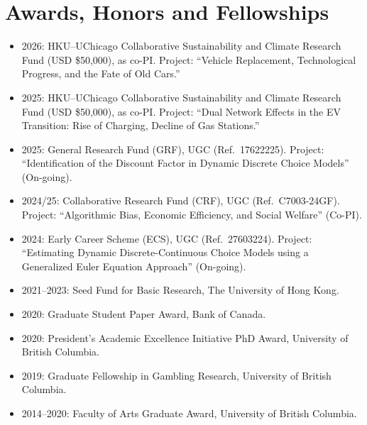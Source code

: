 \documentclass[11pt]{article}
\begin{document}
\section*{Awards, Honors and Fellowships}
\begin{itemize}[leftmargin=*,itemsep=0pt,parsep=0pt,topsep=1pt]
  \item \textcolor{muted}{2026:} HKU--UChicago Collaborative Sustainability and Climate Research Fund (USD \$50,000), as co-PI. Project: ``Vehicle Replacement, Technological Progress, and the Fate of Old Cars.''
  \item \textcolor{muted}{2025:} HKU--UChicago Collaborative Sustainability and Climate Research Fund (USD \$50,000), as co-PI. Project: ``Dual Network Effects in the EV Transition: Rise of Charging, Decline of Gas Stations.''
  \item \textcolor{muted}{2025:} General Research Fund (GRF), UGC (Ref.\ 17622225). Project: ``Identification of the Discount Factor in Dynamic Discrete Choice Models'' (On-going).
  \item \textcolor{muted}{2024/25:} Collaborative Research Fund (CRF), UGC (Ref.\ C7003-24GF). Project: ``Algorithmic Bias, Economic Efficiency, and Social Welfare'' (Co-PI).
  \item \textcolor{muted}{2024:} Early Career Scheme (ECS), UGC (Ref.\ 27603224). Project: ``Estimating Dynamic Discrete-Continuous Choice Models using a Generalized Euler Equation Approach'' (On-going).
  \item \textcolor{muted}{2021--2023:} Seed Fund for Basic Research, The University of Hong Kong.
  \item \textcolor{muted}{2020:} Graduate Student Paper Award, Bank of Canada.
  \item \textcolor{muted}{2020:} President's Academic Excellence Initiative PhD Award, University of British Columbia.
  \item \textcolor{muted}{2019:} Graduate Fellowship in Gambling Research, University of British Columbia.
  \item \textcolor{muted}{2014--2020:} Faculty of Arts Graduate Award, University of British Columbia.
\end{itemize}
\end{document}
